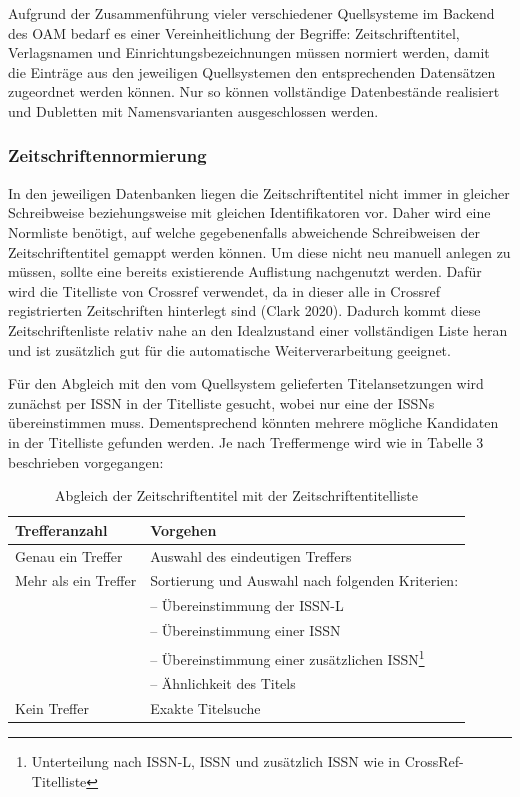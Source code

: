 \documentclass[a4paper,
fontsize=11pt,
oneside,
numbers=noperiodatend,
parskip=half-,
bibliography=totoc,
final
]{scrartcl}
\begin{document}
Aufgrund der Zusammenführung vieler verschiedener Quellsysteme im
Backend des OAM bedarf es einer Vereinheitlichung der Begriffe:
Zeitschriftentitel, Verlagsnamen und Einrichtungsbezeichnungen müssen
normiert werden, damit die Einträge aus den jeweiligen Quellsystemen den
entsprechenden Datensätzen zugeordnet werden können. Nur so können
vollständige Datenbestände realisiert und Dubletten mit Namensvarianten
ausgeschlossen werden.

\hypertarget{zeitschriftennormierung}{%
\subsubsection{Zeitschriftennormierung}\label{zeitschriftennormierung}}

In den jeweiligen Datenbanken liegen die Zeitschriftentitel nicht immer
in gleicher Schreibweise beziehungsweise mit gleichen Identifikatoren
vor. Daher wird eine Normliste benötigt, auf welche gegebenenfalls
abweichende Schreibweisen der Zeitschriftentitel gemappt werden können.
Um diese nicht neu manuell anlegen zu müssen, sollte eine bereits
existierende Auflistung nachgenutzt werden. Dafür wird die Titelliste
von Crossref verwendet, da in dieser alle in Crossref registrierten
Zeitschriften hinterlegt sind (Clark 2020). Dadurch kommt diese
Zeitschriftenliste relativ nahe an den Idealzustand einer vollständigen
Liste heran und ist zusätzlich gut für die automatische
Weiterverarbeitung geeignet.

Für den Abgleich mit den vom Quellsystem gelieferten Titelansetzungen
wird zunächst per ISSN in der Titelliste gesucht, wobei nur eine der
ISSNs übereinstimmen muss. Dementsprechend könnten mehrere mögliche
Kandidaten in der Titelliste gefunden werden. Je nach Treffermenge wird
wie in Tabelle 3 beschrieben vorgegangen:

\begin{table}[!ht]
    \centering
    \begin{tabular}{ll}
    \toprule
        \textbf{Trefferanzahl} & \textbf{Vorgehen} \\
        \midrule
Genau ein Treffer & Auswahl des eindeutigen Treffers \\
Mehr als ein Treffer & Sortierung und Auswahl nach folgenden Kriterien: \\
~ & -- Übereinstimmung der ISSN-L \\
~ & -- Übereinstimmung einer ISSN \\
~ & -- Übereinstimmung einer zusätzlichen ISSN\footnote{Unterteilung nach ISSN-L, ISSN und zusätzlich ISSN wie in CrossRef-Titelliste} \\
~ & -- Ähnlichkeit des Titels \\
Kein Treffer & Exakte Titelsuche \\
  \bottomrule
\end{tabular}
           \caption{Abgleich der Zeitschriftentitel mit der Zeitschriftentitelliste}
\end{table}
\end{document}
